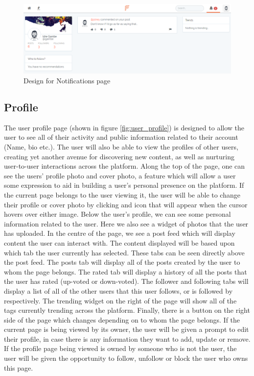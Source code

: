 \begin{figure}[H]
\centering
\includegraphics[width=1\linewidth]{Images/Design/notifications-page}
\caption{Design for Notifications page}
\label{fig:notifications-page}
\end{figure}

\subsection{Profile}
The user profile page (shown in figure \ref{fig:user_profile}) is designed to allow the user to see all of their activity and public information related to their account (Name, bio etc.). The user will also be able to view the profiles of other users, creating yet another avenue for discovering new content, as well as nurturing user-to-user interactions across the platform. Along the top of the page, one can see the users' profile photo and cover photo, a feature which will allow a user some expression to aid in building a user's personal presence on the platform. If the current page belongs to the user viewing it, the user will be able to change their profile or cover photo by clicking and icon that will appear when the cursor hovers over either image. Below the user's profile, we can see some personal information related to the user. Here we also see a widget of photos that the user has uploaded. In the centre of the page, we see a post feed which will display content the user can interact with. The content displayed will be based upon which tab the user currently has selected. These tabs can be seen directly above the post feed. The posts tab will display all of the posts created by the user to whom the page belongs. The rated tab will display a history of all the posts that the user has rated (up-voted or down-voted). The follower and following tabs will display a list of all of the other users that this user follows, or is followed by respectively. The trending widget on the right of the page will show all of the tags currently trending across the platform. Finally, there is a button on the right side of the page which changes depending on to whom the page belongs. If the current page is being viewed by its owner, the user will be given a prompt to edit their profile, in case there is any information they want to add, update or remove. If the profile page being viewed is owned by someone who is not the user, the user will be given the opportunity to follow, unfollow or block the user who owns this page.

